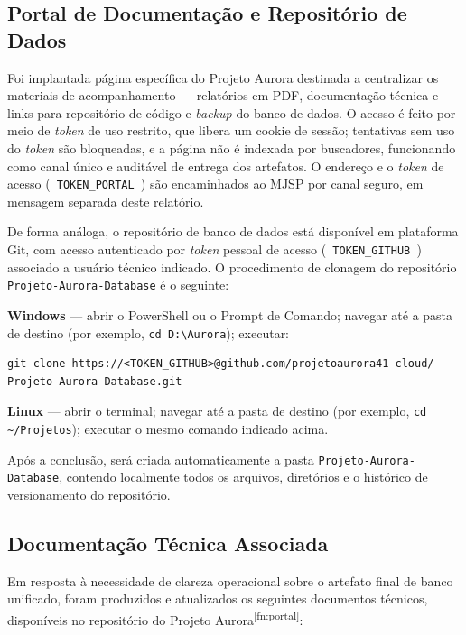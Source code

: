 \documentclass[11pt,a4paper]{article}
\newcommand{\ph}[1]{\texttt{\textlangle\,#1\,\textrangle}}
\begin{document}
\subsection{Portal de Documentação e Repositório de Dados}
\label{subsec:portal_documentacao}

Foi implantada página específica do Projeto Aurora destinada a centralizar os materiais de acompanhamento — relatórios em PDF, documentação técnica e links para repositório de código e \emph{backup} do banco de dados. O acesso é feito por meio de \emph{token} de uso restrito, que libera um cookie de sessão; tentativas sem uso do \emph{token} são bloqueadas, e a página não é indexada por buscadores, funcionando como canal único e auditável de entrega dos artefatos. O endereço e o \emph{token} de acesso (\ph{TOKEN\_PORTAL}) são encaminhados ao MJSP por canal seguro, em mensagem separada deste relatório.

De forma análoga, o repositório de banco de dados está disponível em plataforma Git, com acesso autenticado por \emph{token} pessoal de acesso (\ph{TOKEN\_GITHUB}) associado a usuário técnico indicado. O procedimento de clonagem do repositório \texttt{Projeto-Aurora-Database} é o seguinte:

\vspace{4pt}
\noindent\textbf{Windows} — abrir o PowerShell ou o Prompt de Comando; navegar até a pasta de destino (por exemplo, \texttt{cd D:\textbackslash Aurora}); executar:
\begin{verbatim}
git clone https://<TOKEN_GITHUB>@github.com/projetoaurora41-cloud/
Projeto-Aurora-Database.git
\end{verbatim}

\noindent\textbf{Linux} — abrir o terminal; navegar até a pasta de destino (por exemplo, \texttt{cd \textasciitilde/Projetos}); executar o mesmo comando indicado acima.

Após a conclusão, será criada automaticamente a pasta \texttt{Projeto-Aurora-Database}, contendo localmente todos os arquivos, diretórios e o histórico de versionamento do repositório.

\subsection{Documentação Técnica Associada}
\label{subsec:documentacao_tecnica}

Em resposta à necessidade de clareza operacional sobre o artefato final de banco unificado, foram produzidos e atualizados os seguintes documentos técnicos, disponíveis no repositório do Projeto Aurora\textsuperscript{\ref{fn:portal}}:
\end{document}
